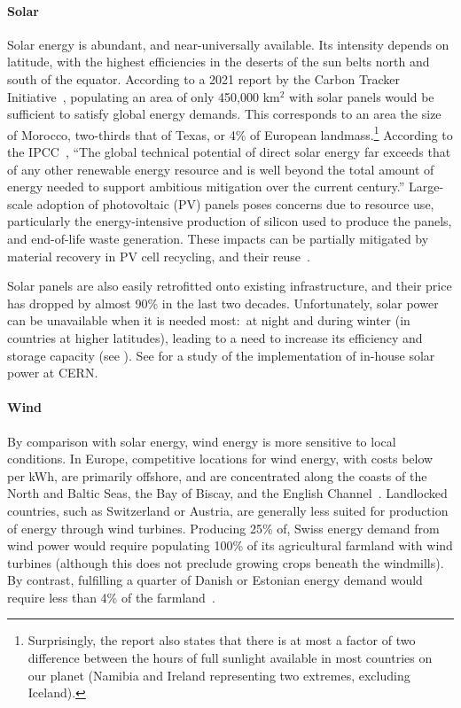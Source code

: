 \documentclass[../SustainableHEP.tex]{subfiles}
\begin{document}
\paragraph{Solar}

Solar energy is abundant, and near-universally available.  Its intensity depends on latitude, with the highest efficiencies in the deserts of the sun belts north and south of the equator. According to a 2021 report by the Carbon Tracker Initiative~\cite{CarbonTracker21}, populating an area of only 450,000 km$^2$ with solar panels would be sufficient to satisfy global energy demands.  This corresponds to an area the size of Morocco, two-thirds that of Texas, or 4\% of European landmass.\footnote{Surprisingly, the report also states that there is at most a factor of two difference between the hours of full sunlight available in most countries on our planet (Namibia and Ireland representing two extremes, excluding Iceland).}  According to the IPCC~\cite{IPCCMitigationReport}, ``The global technical potential of direct solar energy far exceeds that of any other renewable energy resource and is well beyond the total amount of energy needed to support ambitious mitigation over the current century.''  Large-scale adoption of photovoltaic (PV) panels poses concerns due to resource use, particularly the energy-intensive production of silicon used to produce the panels, and end-of-life waste generation.  These impacts can be partially mitigated by material recovery in PV cell recycling, and their reuse~\cite{DANIELAABIGAIL2022103539}.

Solar panels are also easily retrofitted onto existing infrastructure, and their price has dropped by almost 90\% in the last two decades.  Unfortunately, solar power can be unavailable when it is needed most:\ at night and during winter (in countries at higher latitudes), leading to a need to increase its efficiency and storage capacity (see ). See  for a study of the implementation of in-house solar power at CERN.

\paragraph{Wind}

By comparison with solar energy, wind energy is more sensitive to local conditions. In Europe, competitive locations for wind energy, with costs below  per kWh, are primarily offshore, and are concentrated along the coasts of the North and Baltic Seas, the Bay of Biscay, and the English Channel~\cite{EEAWindEnergy}.
Landlocked countries, such as Switzerland or Austria, are generally less suited for production of energy through wind turbines. Producing 25\% of, \eg Swiss energy demand from wind power would require populating 100\% of its agricultural farmland with wind turbines (although this does not preclude growing crops beneath the windmills).  By contrast, fulfilling a quarter of Danish or Estonian energy demand would require less than 4\% of the farmland~\cite{EEAWindEnergy}. 
\end{document}
